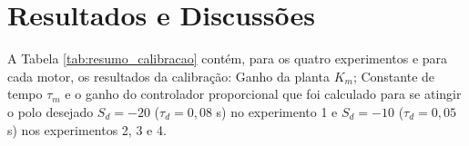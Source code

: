 \chapter[Resultados]{Resultados e Discussões}
\label{ch:resultados}






A Tabela \ref{tab:resumo_calibracao} contém, para os quatro experimentos e para cada motor, os resultados da calibração: Ganho da planta $K_m$; Constante de tempo $\tau_m$ e o ganho do controlador proporcional que foi calculado para se atingir o polo desejado $S_d = -20$ ($\tau_{d} = 0,08$ s) no experimento 1 e $S_d = -10$ ($\tau_{d} = 0,05$ s) nos experimentos 2, 3 e 4.

